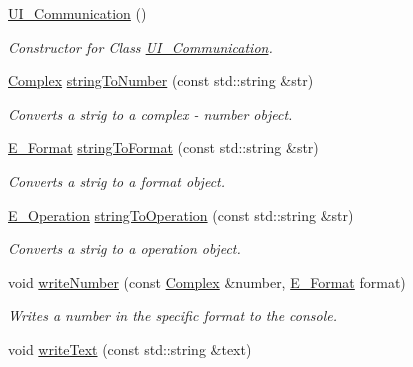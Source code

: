 \begin{DoxyCompactItemize}
\item 
\mbox{\hyperlink{class_u_i___communication_aa7f9e5d5a946a33469e8a76e1fdbdec8}{U\+I\+\_\+\+Communication}} ()
\begin{DoxyCompactList}\small\item\em Constructor for Class \mbox{\hyperlink{class_u_i___communication}{U\+I\+\_\+\+Communication}}. \end{DoxyCompactList}\item 
\mbox{\hyperlink{class_complex}{Complex}} \mbox{\hyperlink{class_u_i___communication_ac0196e2d6866f1dc548940abfa4f53a2}{string\+To\+Number}} (const std\+::string \&str)
\begin{DoxyCompactList}\small\item\em Converts a strig to a complex -\/ number object. \end{DoxyCompactList}\item 
\mbox{\hyperlink{_complex_8h_adaa0992033b28ba1421a05c029ffa82e}{E\+\_\+\+Format}} \mbox{\hyperlink{class_u_i___communication_aa3cc2f29ba1415624631e515de310523}{string\+To\+Format}} (const std\+::string \&str)
\begin{DoxyCompactList}\small\item\em Converts a strig to a format object. \end{DoxyCompactList}\item 
\mbox{\hyperlink{_calculation_8h_a57e7c508a7a8b39e59743eb5a00b2ef7}{E\+\_\+\+Operation}} \mbox{\hyperlink{class_u_i___communication_aceca172436990f48b2bfd27f2c180423}{string\+To\+Operation}} (const std\+::string \&str)
\begin{DoxyCompactList}\small\item\em Converts a strig to a operation object. \end{DoxyCompactList}\item 
void \mbox{\hyperlink{class_u_i___communication_a09b78ff23be1ef53673a0357e02368e4}{write\+Number}} (const \mbox{\hyperlink{class_complex}{Complex}} \&number, \mbox{\hyperlink{_complex_8h_adaa0992033b28ba1421a05c029ffa82e}{E\+\_\+\+Format}} format)
\begin{DoxyCompactList}\small\item\em Writes a number in the specific format to the console. \end{DoxyCompactList}\item 
void \mbox{\hyperlink{class_u_i___communication_a2a5e6618db73c2db5b8d12a6270dd8c1}{write\+Text}} (const std\+::string \&text)

\end{DoxyCompactItemize}
